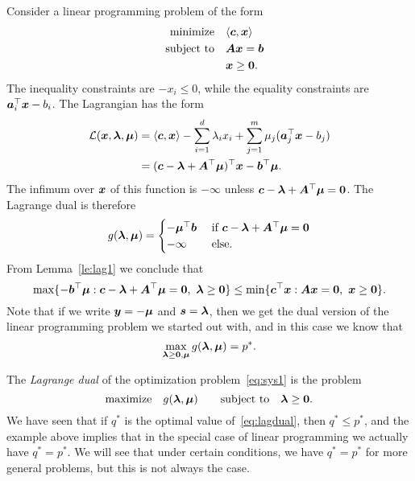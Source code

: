 \begin{example}
 Consider a linear programming problem of the form
 \begin{align*}
  \text{minimize}\quad & \langle {\bm{c}}, {\bm{x}} \rangle\\
  \quad\text{subject to}\quad & \bm{A}\bm{x}=\bm{b}\\
  & \bm{x}\geq \bm{0}.
 \end{align*}
The inequality constraints are $-x_i\leq 0$, while the equality constraints are $\bm{a}_i^{\top}\bm{x}-b_i$. The Lagrangian has the form
\begin{align*}
 \mathcal{L}(\bm{x},\bm{\lambda},\bm{\mu}) &= \langle {\bm{c}}, {\bm{x}} \rangle-\sum_{i=1}^d \lambda_i x_i + \sum_{j=1}^m \mu_j(\bm{a}_j^{\top}\bm{x}-b_j)\\
 &= (\bm{c}-\bm{\lambda}+\bm{A}^{\top}\bm{\mu})^{\top}\bm{x}-\bm{b}^{\top}\bm{\mu}.
\end{align*}
The infimum over $\bm{x}$ of this function is $-\infty$ unless $\bm{c}-\bm{\lambda}+\bm{A}^{\top}\bm{\mu}= \bm{0}$. The Lagrange dual is therefore
\begin{equation*}
 g(\bm{\lambda},\bm{\mu}) = \begin{cases} 
                               -\bm{\mu}^{\top}\bm{b} & \text{ if } \bm{c}-\bm{\lambda}+\bm{A}^{\top}\bm{\mu}=\bm{0}\\
                               -\infty & \text{ else.}
                              \end{cases}
\end{equation*}
From Lemma~\ref{le:lag1} we conclude that
\begin{equation*}
 \max \{-\vct{b}^{\trans}\vct{\mu} \mid \vct{c}-\vct{\lambda}+\mtx{A}^{\trans}\vct{\mu}=\zerovct, \ \vct{\lambda}\geq \zerovct\} \leq \min \{\vct{c}^{\trans}\vct{x} \mid \mtx{A}\vct{x}=\zerovct, \ \vct{x}\geq \zerovct\}.
\end{equation*}
Note that if we write $\bm{y}=-\bm{\mu}$ and $\bm{s}=\bm{\lambda}$, then we get the dual version of the linear programming problem we started out with, and in this case we know that 
\begin{equation*}
 \max_{\bm{\lambda}\geq \bm{0},\bm{\mu}} g(\bm{\lambda},\bm{\mu}) = p^*.
\end{equation*}
\end{example}

The {\em Lagrange dual} of the optimization problem~\eqref{eq:sys1} is the problem
\begin{equation}\label{eq:lagdual}
 \text{maximize}\quad g(\bm{\lambda},\bm{\mu}) \quad \quad\text{subject to}\quad \bm{\lambda}\geq \bm{0}.
\end{equation}
We have seen that if $q^*$ is the optimal value of~\eqref{eq:lagdual}, then $q^*\leq p^*$, and the example above implies that in the special case of linear programming we actually have $q^*=p^*$. We will see that under certain conditions, we have $q^*=p^*$ for more general problems, but this is not always the case.



